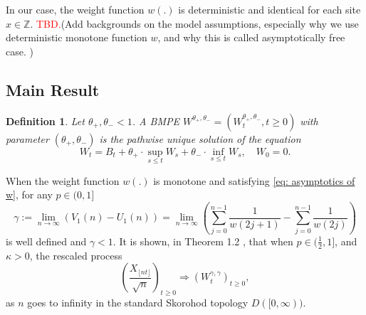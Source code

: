 \documentclass[twoside,12pt,a4paper]{article}
\newtheorem{definition}{Definition}[section]
\numberwithin{equation}{section}
\newcommand\TBD{\textcolor{red}{TBD.}}
\begin{document}
	In our case, the weight function $w(.)$ is deterministic and identical for each site $x\in \mathbb{Z}$. \TBD (Add backgrounds on the model assumptions, especially why we use deterministic monotone function $w$, and why this is called asymptotically free case. )
	
	\subsection{Main Result}
	\begin{definition}
		Let $\theta_+, \theta_- <1$. A BMPE $W^{\theta_+, \theta_-} = \left(W^{\theta_+, \theta_-}_t, t\geq 0\right)$ with parameter  $(\theta_+, \theta_-)$ is the pathwise unique solution of the equation
		$$
		W_t = B_t + \theta_+ \cdot \sup_{s\leq t} W_s  + \theta_- \cdot \inf_{s\leq t} W_s,   \quad W_0 = 0.
		$$
	\end{definition}
	When the weight function $w(.)$ is monotone and satisfying \eqref{eq: asymptotics of w}, for any $p\in (0,1]$
	\begin{equation}\label{eq: gamma}
		\gamma:= \lim_{n\to \infty}\left( V_1(n) - U_1(n) \right) =\lim_{n\to \infty} \left( \sum_{j=0}^{n-1} \frac{1}{ w(2j+1)}-  \sum_{j=0}^{n-1}  \frac{1}{w(2j)} \right) 
	\end{equation}
	is well defined and $\gamma<1$. It is shown, in Theorem 1.2 \cite{KMP22}, that when $p\in (\frac{1}{2},1]$, and $\kappa >0 $, the rescaled process
	$$
	\left(  \frac{X_{\lfloor nt \rfloor }}{\sqrt{n}}  \right)_{t\geq 0} \Longrightarrow \left( W^{\gamma,\gamma}_{t}\right)_{t\geq 0},
	$$ as $n$ goes to infinity in the standard Skorohod topology $D([0,\infty) ).$
	
\end{document}

